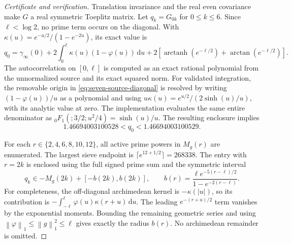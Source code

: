 \documentclass[11pt]{article}
\numberwithin{equation}{section}
\theoremstyle{definition}
\theoremstyle{remark}
\newcommand{\norm}[1]{\left\lVert #1\right\rVert}
\newcommand{\dd}{\,\mathrm d}
\begin{document}
\begin{proof}[Certificate and verification]
Translation invariance and the real even covariance make \(G\) a real
symmetric Toeplitz matrix.  Let \(q_k=G_{0k}\) for \(0\leq k\leq6\).
Since \(\ell<\log2\), no prime term occurs on the diagonal.  With
\(\kappa(u)=e^{-u/2}/(1-e^{-2u})\), its exact value is
\begin{equation}\label{eq:seven-source-diagonal}
 q_0=\gamma_\infty(0)
 +2\int_0^\ell\kappa(u)(1-\varphi(u))\dd u
 +2\left[\operatorname{arctanh}(e^{-\ell/2})
                  +\arctan(e^{-\ell/2})\right].
\end{equation}
The autocorrelation on \([0,\ell]\) is computed as an exact rational
polynomial from the unnormalized source and its exact squared norm.
For validated integration, the removable origin in
\eqref{eq:seven-source-diagonal} is resolved by writing
\((1-\varphi(u))/u\) as a polynomial and using
\(u\kappa(u)=e^{u/2}/(2\sinh(u)/u)\), with its analytic value at zero.
The implementation evaluates the same entire denominator as
\({}_0F_1(;3/2;u^2/4)=\sinh(u)/u\).
The resulting enclosure implies
\[
 1.46694003100528<q_0<1.46694003100529.
\]

For each \(r\in\{2,4,6,8,10,12\}\), all active prime powers in
\(M_g(r)\) are enumerated.  The largest sieve endpoint is
\(\lceil e^{12+1/2}\rceil=268338\).  The entry with \(r=2k\) is
enclosed using the full signed prime sum and the symmetric interval
\begin{equation}\label{eq:seven-source-offdiagonal}
 q_k\in-M_g(2k)+[-b(2k),b(2k)],\qquad
 b(r)=\frac{\ell e^{-5(r-\ell)/2}}{1-e^{-2(r-\ell)}}.
\end{equation}
For completeness, the off-diagonal archimedean kernel is
\(-\kappa(|u|)\), so its contribution is
\(-\int_{-\ell}^\ell\varphi(u)\kappa(r+u)\dd u\).
The leading \(e^{-(r+u)/2}\) term vanishes by the exponential moments.
Bounding the remaining geometric series and using
\(\norm\varphi_1\leq\norm g_1^2\leq\ell\) gives exactly the radius
\(b(r)\).  No archimedean remainder is omitted.


\end{proof}
\end{document}
